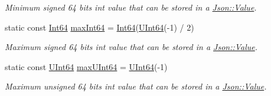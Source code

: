 \begin{DoxyCompactItemize}
\begin{DoxyCompactList}\small\item\em Minimum signed 64 bits int value that can be stored in a \hyperlink{class_json_1_1_value}{Json\+::\+Value}. \end{DoxyCompactList}\item 
static const \hyperlink{class_json_1_1_value_a1b86af9f85f0f1baa972c3319fa22695}{Int64} \hyperlink{class_json_1_1_value_aa26897140547da2337772e39a8a68780}{max\+Int64} = \hyperlink{class_json_1_1_value_a1b86af9f85f0f1baa972c3319fa22695}{Int64}(\hyperlink{class_json_1_1_value_a8b62564be8c087c6d18de180ff4e13e3}{U\+Int64}(-\/1) / 2)
\begin{DoxyCompactList}\small\item\em Maximum signed 64 bits int value that can be stored in a \hyperlink{class_json_1_1_value}{Json\+::\+Value}. \end{DoxyCompactList}\item 
static const \hyperlink{class_json_1_1_value_a8b62564be8c087c6d18de180ff4e13e3}{U\+Int64} \hyperlink{class_json_1_1_value_a069dd34617e27dd9922ced3a0160280d}{max\+U\+Int64} = \hyperlink{class_json_1_1_value_a8b62564be8c087c6d18de180ff4e13e3}{U\+Int64}(-\/1)
\begin{DoxyCompactList}\small\item\em Maximum unsigned 64 bits int value that can be stored in a \hyperlink{class_json_1_1_value}{Json\+::\+Value}. \end{DoxyCompactList}\end{DoxyCompactItemize}
